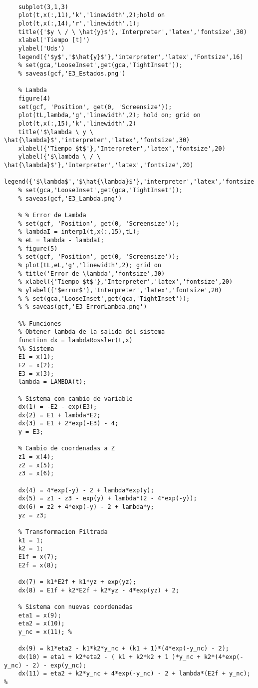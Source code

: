 \begin{verbatim}
	
	subplot(3,1,3)
	plot(t,x(:,11),'k','linewidth',2);hold on
	plot(t,x(:,14),'r','linewidth',1);
	title({'$y \ / \ \hat{y}$'},'Interpreter','latex','fontsize',30)
	xlabel('Tiempo [t]')
	ylabel('Uds')
	legend({'$y$','$\hat{y}$'},'interpreter','latex','Fontsize',16)
	% set(gca,'LooseInset',get(gca,'TightInset'));
	% saveas(gcf,'E3_Estados.png')
	
	% Lambda
	figure(4)
	set(gcf, 'Position', get(0, 'Screensize'));
	plot(tL,lambda,'g','linewidth',2); hold on; grid on
	plot(t,x(:,15),'k','linewidth',2)
	title('$\lambda \ y \ \hat{\lambda}$','interpreter','latex','fontsize',30)
	xlabel({'Tiempo $t$'},'Interpreter','latex','fontsize',20)
	ylabel({'$\lambda \ / \ \hat{\lambda}$'},'Interpreter','latex','fontsize',20)
	legend({'$\lambda$','$\hat{\lambda}$'},'interpreter','latex','fontsize',16)
	% set(gca,'LooseInset',get(gca,'TightInset'));
	% saveas(gcf,'E3_Lambda.png')
	
	% % Error de Lambda
	% set(gcf, 'Position', get(0, 'Screensize'));
	% lambdaI = interp1(t,x(:,15),tL);
	% eL = lambda - lambdaI;
	% figure(5)
	% set(gcf, 'Position', get(0, 'Screensize'));
	% plot(tL,eL,'g','linewidth',2); grid on
	% title('Error de \lambda','fontsize',30)
	% xlabel({'Tiempo $t$'},'Interpreter','latex','fontsize',20)
	% ylabel({'$error$'},'Interpreter','latex','fontsize',20)
	% % set(gca,'LooseInset',get(gca,'TightInset'));
	% % saveas(gcf,'E3_ErrorLambda.png')
	
	%% Funciones
	% Obtener lambda de la salida del sistema
	function dx = lambdaRossler(t,x)
	%% Sistema
	E1 = x(1);
	E2 = x(2);
	E3 = x(3);
	lambda = LAMBDA(t);
	
	% Sistema con cambio de variable
	dx(1) = -E2 - exp(E3);
	dx(2) = E1 + lambda*E2;
	dx(3) = E1 + 2*exp(-E3) - 4;
	y = E3;
	
	% Cambio de coordenadas a Z
	z1 = x(4);
	z2 = x(5);
	z3 = x(6);
	
	dx(4) = 4*exp(-y) - 2 + lambda*exp(y);
	dx(5) = z1 - z3 - exp(y) + lambda*(2 - 4*exp(-y));
	dx(6) = z2 + 4*exp(-y) - 2 + lambda*y;
	yz = z3;
	
	% Transformacion Filtrada
	k1 = 1;
	k2 = 1;
	E1f = x(7);
	E2f = x(8);
	
	dx(7) = k1*E2f + k1*yz + exp(yz);
	dx(8) = E1f + k2*E2f + k2*yz - 4*exp(yz) + 2;
	
	% Sistema con nuevas coordenadas
	eta1 = x(9);
	eta2 = x(10);
	y_nc = x(11); %
	
	dx(9) = k1*eta2 - k1*k2*y_nc + (k1 + 1)*(4*exp(-y_nc) - 2);
	dx(10) = eta1 + k2*eta2 - ( k1 + k2*k2 + 1 )*y_nc + k2*(4*exp(-y_nc) - 2) - exp(y_nc);
	dx(11) = eta2 + k2*y_nc + 4*exp(-y_nc) - 2 + lambda*(E2f + y_nc);  %
	

\end{verbatim}
